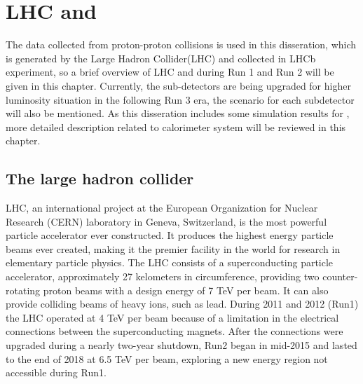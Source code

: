
\chapter{LHC and \lhcb }
\label{chap:lhcb}

The data collected from proton-proton collisions is used in this disseration,
which is generated by the Large Hadron Collider(LHC) and collected in LHCb experiment,
so a brief overview of LHC and \lhcb during Run 1 and Run 2 will be given in this chapter.
Currently, 
the \lhcb sub-detectors are being upgraded for higher luminosity situation in the following Run 3 era, 
the \upgradeone scenario for each subdetector will also be mentioned.  
As this disseration includes some \ecal simulation results for \lhcb \upgradetwo,
more detailed description related to \lhcb calorimeter system will be reviewed in this chapter.

\section{The large hadron collider}

LHC, 
an international project at the European Organization for Nuclear Research (CERN) laboratory in Geneva, Switzerland, 
is the most powerful particle accelerator ever constructed. 
It produces the highest energy particle beams ever created, 
making it the premier facility in the world for research in elementary particle physics. 
The LHC consists of a superconducting particle accelerator, 
approximately 27 kelometers in circumference, 
providing two counter-rotating proton beams with a design energy of 7 TeV per beam. 
It can also provide colliding beams of heavy ions, such as lead. 
During 2011 and 2012 (Run1) the LHC operated at 4 TeV per beam because of a limitation in the electrical connections
between the superconducting magnets. 
After the connections were upgraded during a nearly two-year shutdown, 
Run2 began in mid-2015 and lasted to the end of 2018 at 6.5 TeV per beam,
exploring a new energy region not accessible during Run1. 

